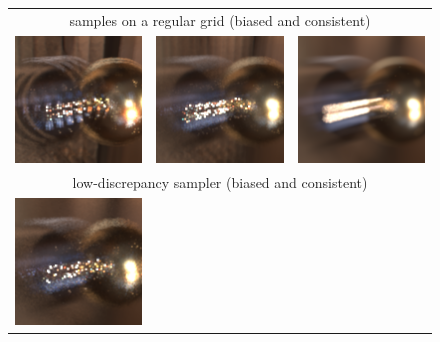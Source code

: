 %
%
%
\begin{figure}
\begin{tabular}{c c c}
\multicolumn{3}{c}{samples on a regular grid (biased and consistent)}\\
  \includegraphics[width=.3\linewidth]{../PBRTOut/pngs/testmb_ball.scene_GRID_2_Samps_iter_1_1_uj.exr.png}&
  \includegraphics[width=.3\linewidth]{../PBRTOut/pngs/testmb_ball.scene_GRID_4_Samps_iter_1_1_uj.exr.png}&
  \includegraphics[width=.3\linewidth]{../PBRTOut/pngs/testmb_ball.scene_GRID_64_Samps_iter_1_1_uj.exr.png}\\
  \hline
\multicolumn{3}{c}{low-discrepancy sampler (biased and consistent)}\\
  \includegraphics[width=.3\linewidth]{../PBRTOut/pngs/testmb_ball.scene_LD_4_Samps_iter_1__uj.exr.png}&

\end{tabular}
\end{figure}
